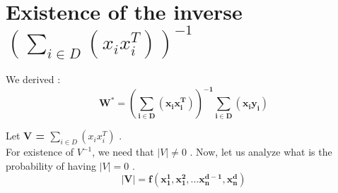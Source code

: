 \documentclass[11pt, twosides]{article}
\begin{document}
\section{Existence of the inverse ${(\sum_{i \in D} (x_i x_i^T))^{-1}}$}
 
We derived : 
\begin{equation}
    \mathbf{ W^* = (\sum_{i \in D} (x_i x_i^T))^{-1} \sum_{i \in D} (x_i y_i)} 
\end{equation}

Let \textbf{V = $\sum_{i \in D} (x_i x_i^T)$} .\\
For existence of $V^{-1}$, we need that \textbf{$|V| \neq 0 $ }. Now, let us analyze what is the probability of having \textbf{$|V| = 0 $ }.\\
\begin{equation}
    \mathbf{|V| = f( x_1^1, x_1^2, . . . x_n^{d-1}, x_n^d) }
\end{equation}
\end{document}
